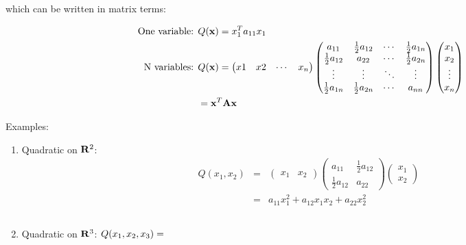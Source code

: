 \documentclass[]{book}
\theoremstyle{definition}
\theoremstyle{definition}
\theoremstyle{definition}
\theoremstyle{remark}
\begin{document}
which can be written in matrix terms:

\begin{align*}
\text{One variable: }& Q({\bf x}) = x_1^T a_{11} x_1\\
\text{N variables: }& Q({\bf x})=\begin{pmatrix} x1&x2&\cdots&x_n\end{pmatrix}
\begin{pmatrix}
a_{11}&\frac{1}{2}a_{12}&\cdots&\frac{1}{2}a_{1n}\\
\frac{1}{2}a_{12}&a_{22}&\cdots&\frac{1}{2}a_{2n}\\
\vdots&\vdots&\ddots&\vdots\\
\frac{1}{2}a_{1n}&\frac{1}{2}a_{2n}&\cdots&a_{nn}
\end{pmatrix}
\begin{pmatrix} x_1\\x_2\\\vdots\\x_n\end{pmatrix}\\
&={\bf x}^T{\bf A}{\bf x}
\end{align*}

Examples:

\begin{enumerate}
  \item Quadratic on ${\bf R}^2$:
  \begin{eqnarray*}
  Q(x_1,x_2)&=&\begin{pmatrix} x_1& x_2 \end{pmatrix} \begin{pmatrix} a_{11}&\frac{1}{2} a_{12}\\
  \frac{1}{2}a_{12}&a_{22}\end{pmatrix} \begin{pmatrix} x_1\\x_2 \end{pmatrix} \\
  &=& a_{11}x_1^2 + a_{12}x_1x_2 + a_{22}x_2^2
  \end{eqnarray*}
  
  \item Quadratic on ${\bf R}^3$:
  $Q(x_1,x_2,x_3)= 
  \phantom{
  \begin{pmatrix} x_1& x_2&x_3 \end{pmatrix}
  \begin{pmatrix} a_{11}&\frac{1}{2} a_{12}&\frac{1}{2} a_{13}\\
  \frac{1}{2}a_{12}&a_{22}&\frac{1}{2} a_{23}\\
  \frac{1}{2}a_{13}&\frac{1}{2}a_{23}& a_{33}\end{pmatrix}
  \begin{pmatrix} x_1\\x_2\\x_3 \end{pmatrix} \\
  = a_{11}x_1^2 + a_{22}x_2^2 + a_{33}x_3^2 + a_{12}x_1x_2 +
      a_{13}x_1x_3 + a_{23}x_2x_3}$
  \vspace{2cm}
\end{enumerate}
\end{document}
